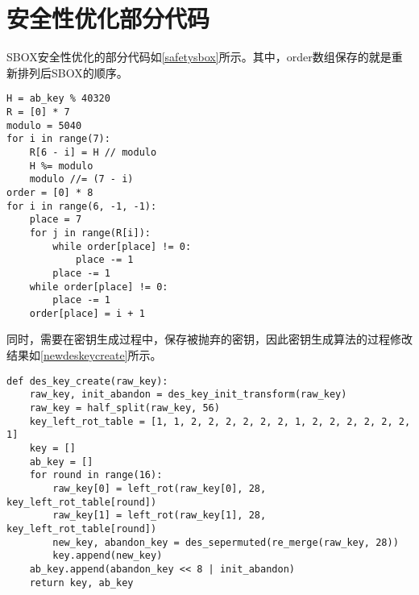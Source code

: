 \documentclass[a4paper, zihao=-4, UTF-8]{ctexart}
\begin{document}
	\section{安全性优化部分代码}\label{apx:safety}
	\par SBOX安全性优化的部分代码如\cref{safetysbox}所示。其中，order数组保存的就是重新排列后SBOX的顺序。
	\begin{lstlisting}[caption={safty\_SBOX}, label={safetysbox}]
H = ab_key % 40320
R = [0] * 7
modulo = 5040
for i in range(7):
	R[6 - i] = H // modulo
	H %= modulo
	modulo //= (7 - i)
order = [0] * 8
for i in range(6, -1, -1):
	place = 7
	for j in range(R[i]):
		while order[place] != 0:
			place -= 1
		place -= 1
	while order[place] != 0:
		place -= 1
	order[place] = i + 1
	\end{lstlisting}
	\par 同时，需要在密钥生成过程中，保存被抛弃的密钥，因此密钥生成算法的过程修改结果如\cref{newdeskeycreate}所示。
	\begin{lstlisting}[caption={des\_key\_create}, label={newdeskeycreate}]
def des_key_create(raw_key):
	raw_key, init_abandon = des_key_init_transform(raw_key)
	raw_key = half_split(raw_key, 56)
	key_left_rot_table = [1, 1, 2, 2, 2, 2, 2, 2, 1, 2, 2, 2, 2, 2, 2, 1]
	key = []
	ab_key = []
	for round in range(16):
		raw_key[0] = left_rot(raw_key[0], 28, key_left_rot_table[round])
		raw_key[1] = left_rot(raw_key[1], 28, key_left_rot_table[round])
		new_key, abandon_key = des_sepermuted(re_merge(raw_key, 28))
		key.append(new_key)
	ab_key.append(abandon_key << 8 | init_abandon)
	return key, ab_key
	\end{lstlisting}
\end{document}
